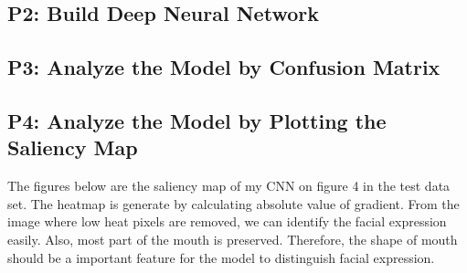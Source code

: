 \documentclass[fleqn,a4paper,12pt]{article}
\begin{document}
\subsection*{P2: Build Deep Neural Network}

\subsection*{P3: Analyze the Model by Confusion Matrix}



\subsection*{P4: Analyze the Model by Plotting the Saliency Map}

The figures below are the saliency map of my CNN on figure 4 in the test data set. The heatmap is generate by calculating absolute value of gradient. From the image where low heat pixels are removed, we can identify the facial expression easily. Also, most part of the mouth is preserved. Therefore, the shape of mouth should be a important feature for the model to distinguish facial expression.
\end{document}
